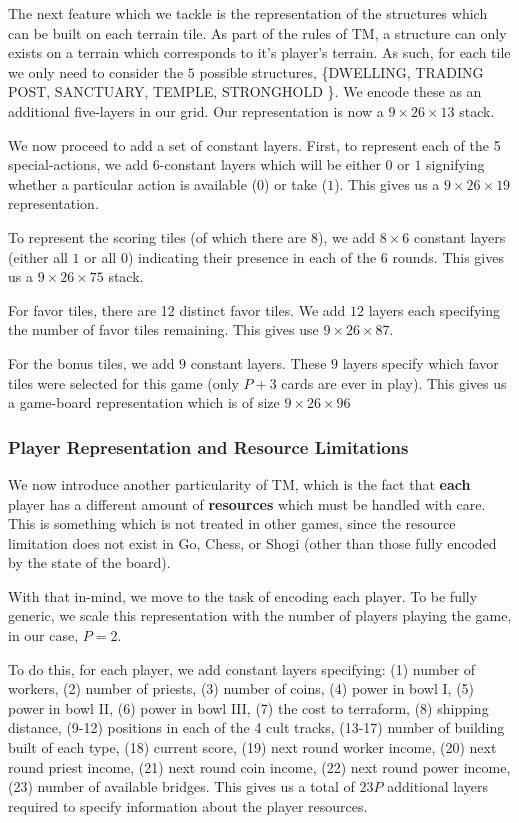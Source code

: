 \documentclass[10pt,twocolumn,letterpaper]{article}
\begin{document}
The next feature which we tackle is the representation of the structures which can be built on each terrain tile. As part of the rules of TM, a structure can only exists on a terrain which corresponds to it's player's terrain. As such, for each tile we only need to consider the $5$ possible structures, \{DWELLING, TRADING POST, SANCTUARY, TEMPLE, STRONGHOLD \}. We encode these as an additional five-layers in our grid. Our representation is now a $9 \times 26 \times 13$ stack.

We now proceed to add a set of constant layers. First, to represent each of the 5 special-actions, we add $6$-constant layers which will be either $0$ or $1$ signifying whether a particular action is available ($0$) or take ($1$). This gives us a $9 \times 26 \times 19$ representation.

To represent the scoring tiles (of which there are 8), we add $8\times6$ constant layers (either all $1$ or all $0$) indicating their presence in each of the $6$ rounds. This gives us a $9 \times 26 \times 75$ stack.

For favor tiles, there are 12 distinct favor tiles. We add $12$ layers each specifying the number of favor tiles remaining. This gives use $9 \times 26 \times 87$.

For the bonus tiles, we add $9$ constant layers. These $9$ layers specify which favor tiles were selected for this game (only $P + 3$ cards are ever in play). This gives us a game-board representation which is of size $9 \times 26 \times 96$

\subsubsection{Player Representation and Resource Limitations}
\label{subsubsection:player_representation_and_resource_limitations}
We now introduce another particularity of TM, which is the fact that \textbf{each} player has a different amount of \textbf{resources} which must be handled with care. This is something which is not treated in other games, since the resource limitation does not exist in Go, Chess, or Shogi (other than those fully encoded by the state of the board).

With that in-mind, we move to the task of encoding each player. To be fully generic, we scale this representation with the number of players playing the game, in our case, $P = 2$.

To do this, for each player, we add constant layers specifying: (1) number of workers, (2) number of priests,  (3) number of coins, (4) power in bowl I, (5) power in bowl II, (6) power in bowl III, (7) the cost to terraform, (8) shipping distance, (9-12) positions in each of the 4 cult tracks, (13-17) number of building built of each type, (18) current score, (19) next round worker income, (20) next round priest income, (21) next round coin income, (22) next round power income, (23) number of available bridges. This gives us a total of $23P$ additional layers required to specify information about the player resources.
\end{document}
